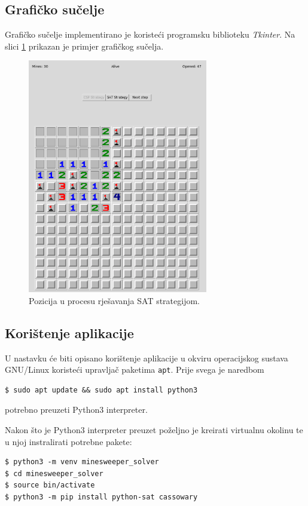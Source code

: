 \documentclass{article}
\numberwithin{figure}{section}
\numberwithin{table}{section}
\begin{document}
\subsection{Grafičko sučelje}

Grafičko sučelje implementirano je koristeći programsku biblioteku \textit{Tkinter}. Na slici \ref{img:GUI} prikazan je primjer grafičkog sučelja.

\begin{figure}[ht]
    \centering
    \includegraphics[width=0.7\textwidth]{images/gui.png}
    \caption{Pozicija u procesu rješavanja SAT strategijom.}
    \label{img:GUI}
\end{figure}

\subsection{Korištenje aplikacije}

U nastavku će biti opisano korištenje aplikacije u okviru operacijskog sustava GNU/Linux
koristeći upravljač paketima \texttt{apt}. Prije svega je naredbom
\begin{verbatim}
$ sudo apt update && sudo apt install python3
\end{verbatim}
potrebno preuzeti Python3 interpreter.

Nakon što je Python3 interpreter preuzet poželjno je kreirati virtualnu okolinu te u njoj
instralirati potrebne pakete:
\begin{verbatim}
$ python3 -m venv minesweeper_solver
$ cd minesweeper_solver
$ source bin/activate
$ python3 -m pip install python-sat cassowary
\end{verbatim}
\end{document}

